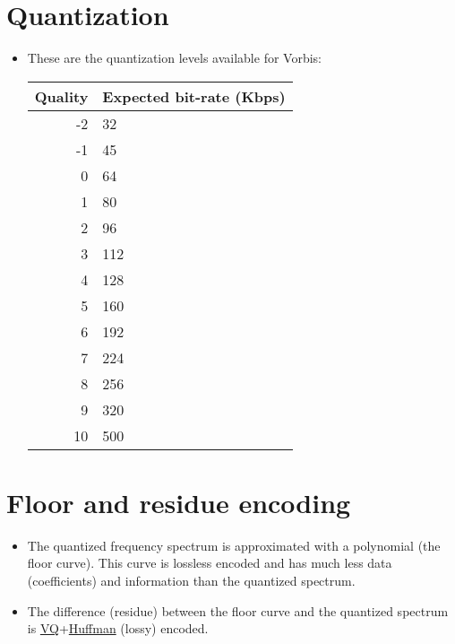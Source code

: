 \begin{itemize}

\section{Quantization}

\begin{itemize}
\item These are the quantization levels available for Vorbis:
  \begin{center}
    \begin{tabular}{r|l}
      Quality & Expected bit-rate (Kbps) \\
      \hline
      -2 & 32 \\
      -1 & 45 \\
      0 & 64 \\
      1 & 80 \\
      2 & 96 \\
      3 & 112 \\
      4 & 128 \\
      5 & 160 \\
      6 & 192 \\
      7 & 224 \\
      8 & 256 \\
      9 & 320 \\
      10 & 500
    \end{tabular}
  \end{center}
\end{itemize}


\section{Floor and residue encoding}

\begin{itemize}
\item The quantized frequency spectrum is approximated with a
  polynomial (the floor curve). This curve is lossless encoded and has
  much less data (coefficients) and information than the quantized
  spectrum.
\item The difference (residue) between the floor curve and the
  quantized spectrum is
  \href{http://www.data-compression.com/vq.shtml}{VQ}+\href{../Text_Coding/index.html#x1-6900015}{Huffman}
  (lossy) encoded.
\end{itemize}


\end{itemize}
